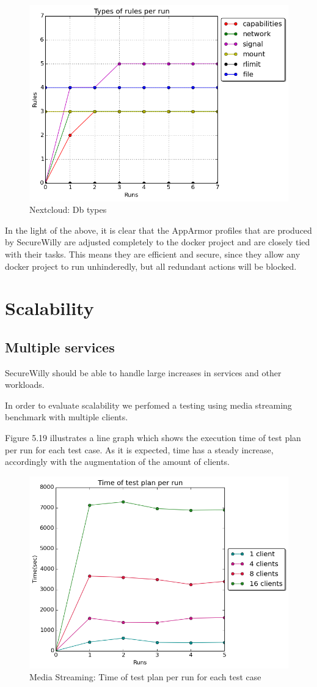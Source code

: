 \begin{figure}[h!]
  \centering
   \includegraphics[width=0.68\linewidth]{../figures/nextcloud/types_db.png}
   \caption{Nextcloud: Db types}
\end{figure}
In the light of the above, it is clear that the AppArmor profiles that are produced by SecureWilly are adjusted completely to the docker project and are closely tied with their tasks. This means they are efficient and secure, since they allow any docker project to run unhinderedly, but all redundant actions will be blocked.\\

\section{Scalability}
\subsection{Multiple services}
SecureWilly should be able to handle large increases in services and other workloads. 

In order to evaluate scalability we perfomed a testing using media streaming benchmark with multiple clients.

Figure 5.19 illustrates a line graph which shows the execution time of test plan per run for each test case. As it is expected, time has a steady increase, accordingly with the augmentation of the amount of clients.

\begin{figure}[h!]
  \centering
   \includegraphics[width=0.8\linewidth]{../figures/scalability/time1_4_8_16.png}
   \caption{Media Streaming: Time of test plan per run for each test case}
\end{figure}

